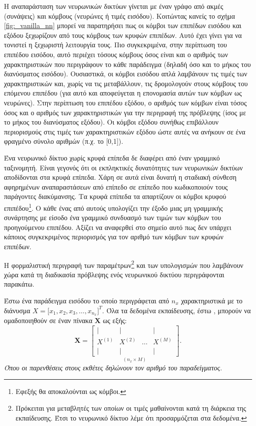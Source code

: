 Η αναπαράσταση των νευρωνικών δικτύων γίνεται με έναν γράφο από ακμές (συνάψεις) και κόμβους (νευρώνες ή τιμές εισόδου). Κοιτώντας κανείς το σχήμα \ref{fig:_vanilla_nn} μπορεί να παρατηρήσει πως οι κόμβοι των επιπέδων εισόδου και εξόδου ξεχωρίζουν από τους κόμβους των κρυφών επιπέδων. Αυτό έχει γίνει για να τονιστεί η ξεχωριστή λειτουργία τους. Πιο συγκεκριμένα, στην περίπτωση του επιπέδου εισόδου, αυτό περιέχει τόσους κόμβους όσος είναι και ο αριθμός των χαρακτηριστικών που περιγράφουν το κάθε παράδειγμα (δηλαδή όσο και το μήκος του διανύσματος εισόδου). Ουσιαστικά, οι κόμβοι εισόδου απλά λαμβάνουν τις τιμές των χαρακτηριστικών και, χωρίς να τις μεταβάλλουν, τις δρομολογούν στους κόμβους του επόμενου επιπέδου (για αυτό και αποφεύγεται η επονομασία αυτών των κόμβων ως νευρώνες). Στην περίπτωση του επιπέδου εξόδου, ο αριθμός των κόμβων είναι τόσος όσος και ο αριθμός των χαρακτηριστικών για την περιγραφή της πρόβλεψης (ίσος με το μήκος του διανύσματος εξόδου). Οι κόμβοι εξόδου συνήθως επιβάλλουν περιορισμούς στις τιμές των χαρακτηριστικών εξόδου ώστε αυτές να ανήκουν σε ένα φραγμένο σύνολο αριθμών (π.χ. το [0,1]).
\par

Ένα νευρωνικό δίκτυο χωρίς κρυφά επίπεδα δε διαφέρει από έναν γραμμικό ταξινομητή. Είναι γεγονός ότι οι εκπληκτικές δυνατότητες των νευρωνικών δικτύων αποδίδονται στα κρυφά επίπεδα. Χάρη σε αυτά είναι δυνατή η σταδιακή σύνθεση αφηρημένων αναπαραστάσεων από επίπεδο σε επίπεδο που κωδικοποιούν τους παράγοντες διακύμανσης. Τα κρυφά επίπεδα τα απαρτίζουν οι κόμβοι κρυφού επιπέδου\footnote{Εφεξής θα αποκαλούνται ως κόμβοι.}. Ο κάθε ένας από αυτούς υπολογίζει την έξοδο μιας μη γραμμικής συνάρτησης με είσοδο ένα γραμμικό συνδυασμό των τιμών των κόμβων του προηγούμενου επιπέδου. Αξίζει να αναφερθεί στο σημείο αυτό πως δεν υπάρχει κάποιος συγκεκριμένος περιορισμός για τον αριθμό των κόμβων των κρυφών επιπέδων. \par

Η φορμαλιστική περιγραφή των παραμέτρων\footnote{Πρόκειται για μεταβλητές των οποίων οι τιμές μαθαίνονται κατά τη διάρκεια της εκπαίδευσης. Έτσι το νευρωνικό δίκτυο λέμε ότι προσαρμόζεται στα δεδομένα.} και των υπολογισμών που λαμβάνουν χώρα κατά τη διαδικασία πρόβλεψης ενός νευρωνικού δικτύου περιγράφονται παρακάτω. \par

Έστω ένα παράδειγμα εισόδου το οποίο περιγράφεται από $n_x$ χαρακτηριστικά με το διάνυσμα \(X = \big[x_1, x_2, x_3, \dots, x_{n_{x}}]^T\). Όλα τα δεδομένα εκπαίδευσης, έστω , μπορούν να ομαδοποιηθούν σε έναν πίνακα $\boldsymbol{X}$ ως εξής: 
\begin{equation}
    \boldsymbol{X} =
    \underset{(n_x \times M)}{\begin{bmatrix}
        |&|&&| \\
        X^{(1)} & X^{(2)} & \dots & X^{(M)}\\
        |&|&&|
    \end{bmatrix}}.
\end{equation}
\textit{Όπου οι παρενθέσεις στους εκθέτες δηλώνουν τον αριθμό του παραδείγματος.}\par

